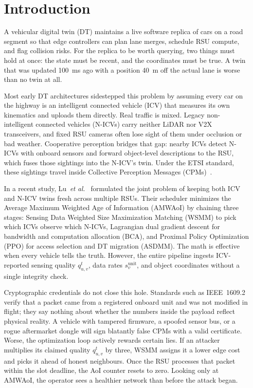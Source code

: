\documentclass[conference]{IEEEtran}
\begin{document}
\section{Introduction}
A vehicular digital twin (DT) maintains a live software replica of cars on a road segment so that edge controllers can plan lane merges, schedule RSU compute, and flag collision risks. For the replica to be worth querying, two things must hold at once: the state must be recent, and the coordinates must be true. A twin that was updated 100~ms ago with a position 40~m off the actual lane is worse than no twin at all.

Most early DT architectures sidestepped this problem by assuming every car on the highway is an intelligent connected vehicle (ICV) that measures its own kinematics and uploads them directly. Real traffic is mixed. Legacy non-intelligent connected vehicles (N-ICVs) carry neither LiDAR nor V2X transceivers, and fixed RSU cameras often lose sight of them under occlusion or bad weather. Cooperative perception bridges that gap: nearby ICVs detect N-ICVs with onboard sensors and forward object-level descriptions to the RSU, which fuses those sightings into the N-ICV's twin. Under the ETSI standard, these sightings travel inside Collective Perception Messages (CPMs)~\cite{etsi}.

In a recent study, Lu~\textit{et al.}~\cite{lu2025} formulated the joint problem of keeping both ICV and N-ICV twins fresh across multiple RSUs. Their scheduler minimizes the Average Maximum Weighted Age of Information (AMWAoI) by chaining three stages: Sensing Data Weighted Size Maximization Matching (WSMM) to pick which ICVs observe which N-ICVs, Lagrangian dual gradient descent for bandwidth and computation allocation (BCA), and Proximal Policy Optimization (PPO) for access selection and DT migration (ASDMM). The math is effective when every vehicle tells the truth. However, the entire pipeline ingests ICV-reported sensing quality $q^t_{u,v}$, data rates $s^{\mathrm{unit}}_v$, and object coordinates without a single integrity check.

Cryptographic credentials do not close this hole. Standards such as IEEE~1609.2~\cite{ieee1609} verify that a packet came from a registered onboard unit and was not modified in flight; they say nothing about whether the numbers inside the payload reflect physical reality. A vehicle with tampered firmware, a spoofed sensor bus, or a rogue aftermarket dongle will sign blatantly false CPMs with a valid certificate. Worse, the optimization loop actively rewards certain lies. If an attacker multiplies its claimed quality $q^t_{u,v}$ by three, WSMM assigns it a lower edge cost and picks it ahead of honest neighbours. Once the RSU processes that packet within the slot deadline, the AoI counter resets to zero. Looking only at AMWAoI, the operator sees a healthier network than before the attack began.
\end{document}
